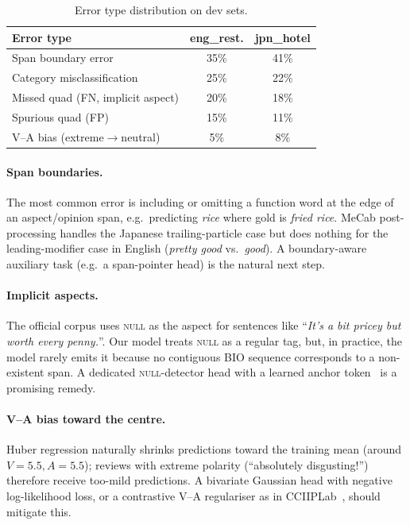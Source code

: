 \documentclass[runningheads]{llncs}
\begin{document}
\begin{table}[htbp]
\centering\small
\caption{Error type distribution on dev sets.}
\label{tab:err}
\begin{tabular}{lcc}
\toprule
Error type & eng\_rest. & jpn\_hotel \\
\midrule
Span boundary error & 35\% & 41\% \\
Category misclassification & 25\% & 22\% \\
Missed quad (FN, implicit aspect) & 20\% & 18\% \\
Spurious quad (FP) & 15\% & 11\% \\
V--A bias (extreme$\to$neutral) & 5\% & 8\% \\
\bottomrule
\end{tabular}
\end{table}

\paragraph{Span boundaries.}
The most common error is including or omitting a function word at the
edge of an aspect/opinion span, e.g.\ predicting \emph{rice} where
gold is \emph{fried rice}. MeCab post-processing handles the Japanese
trailing-particle case but does nothing for the leading-modifier case
in English (\emph{pretty good} vs.\ \emph{good}). A boundary-aware
auxiliary task (e.g.\ a span-pointer head) is the natural next step.

\paragraph{Implicit aspects.}
The official corpus uses \textsc{null} as the aspect for sentences
like ``\textit{It's a bit pricey but worth every penny.}''.
Our model treats \textsc{null} as a regular tag, but, in practice, the
model rarely emits it because no contiguous BIO sequence corresponds
to a non-existent span. A dedicated \textsc{null}-detector head with a
learned anchor token~\cite{cai2021acos} is a promising remedy.

\paragraph{V--A bias toward the centre.}
Huber regression naturally shrinks predictions toward the training
mean (around $V{=}5.5, A{=}5.5$); reviews with extreme polarity
(``absolutely disgusting!'') therefore receive too-mild predictions.
A bivariate Gaussian head with negative log-likelihood loss, or a
contrastive V--A regulariser as in
CCIIPLab~\cite{sighan2024dimabsa}, should mitigate this.
\end{document}
